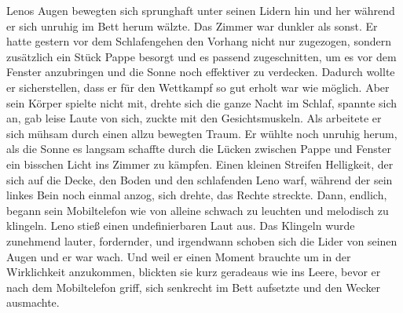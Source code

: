 \documentclass[ngerman,smalldemyvopaper,11pt,oneside,onecolumn,openright,extrafontsizes]{memoir}
\begin{document}
Lenos Augen bewegten sich sprunghaft unter seinen Lidern hin und her während er sich unruhig im Bett herum wälzte. Das Zimmer war dunkler als sonst. Er hatte gestern vor dem Schlafengehen den Vorhang nicht nur zugezogen, sondern zusätzlich ein Stück Pappe besorgt und es passend zugeschnitten, um es vor dem Fenster anzubringen und die Sonne noch effektiver zu verdecken. Dadurch wollte er sicherstellen, dass er für den Wettkampf so gut erholt war wie möglich. Aber sein Körper spielte nicht mit, drehte sich die ganze Nacht im Schlaf, spannte sich an, gab leise Laute von sich, zuckte mit den Gesichtsmuskeln. Als arbeitete er sich mühsam durch einen allzu bewegten Traum. Er wühlte noch unruhig herum, als die Sonne es langsam schaffte durch die Lücken zwischen Pappe und Fenster ein bisschen Licht ins Zimmer zu kämpfen. Einen kleinen Streifen Helligkeit, der sich auf die Decke, den Boden und den schlafenden Leno warf, während der sein linkes Bein noch einmal anzog, sich drehte, das Rechte streckte. Dann, endlich, begann sein Mobiltelefon wie von alleine schwach zu leuchten und melodisch zu klingeln. Leno stieß einen undefinierbaren Laut aus. Das Klingeln wurde zunehmend lauter, fordernder, und irgendwann schoben sich die Lider von seinen Augen und er war wach. Und weil er einen Moment brauchte um in der Wirklichkeit anzukommen, blickten sie kurz geradeaus wie ins Leere, bevor er nach dem Mobiltelefon griff, sich senkrecht im Bett aufsetzte und den Wecker ausmachte.
\vspace{0.5em} \\
\end{document}
